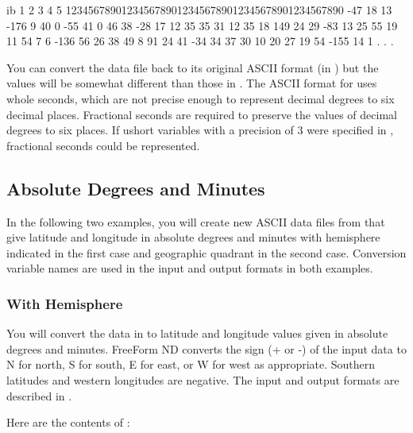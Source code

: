 \begin{vcode}{ib}
         1         2         3         4         5
12345678901234567890123456789012345678901234567890
    -47      18      13    -176       9      40
      0     -55      41       0      46      38
    -28      17      12      35      35      31
     12      35      18     149      24      29
    -83      13      25      55      19      11
     54       7       6    -136      56      26
     38      49       8      91      24      41
    -34      34      37      30      10      20
     27      19      54    -155      14       1
                .
                .
                . 
\end{vcode}

You can convert the data file  back to its original ASCII
format (in ) but the values will be somewhat different than
those in . The ASCII format for  uses whole
seconds, which are not precise enough to represent decimal degrees to
six decimal places. Fractional seconds are required to preserve the
values of decimal degrees to six places. If ushort variables with a
precision of 3 were specified in , fractional seconds
could be represented.

\subsection{Absolute Degrees and Minutes}

In the following two examples, you will create new ASCII data files
from  that give latitude and longitude in absolute degrees
and minutes with hemisphere indicated in the first case and geographic
quadrant in the second case. Conversion variable names are used in the
input and output formats in both examples.

\subsubsection{With Hemisphere}

You will convert the data in  to latitude and longitude
values given in absolute degrees and minutes. FreeForm ND converts the
sign (+ or -) of the input data to N for north, S for south, E for
east, or W for west as appropriate. Southern latitudes and western
longitudes are negative. The input and output formats are described in
.

Here are the contents of  :

